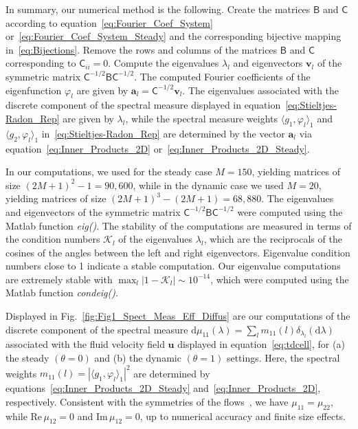 \documentclass[leqno,onefignum,onetabnum]{siamltex1213}
\newcommand{\figref}[1]{Fig.~\ref{#1}}
\renewcommand{\d}{\mathrm{d}}
\newcommand\Real{\mbox{Re}\,} %
\newcommand\Imag{\mbox{Im}\,} %
\newcommand{\Bm}{\mathsf{B}}
\newcommand{\Cm}{\mathsf{C}}
\newcommand{\vecv}{\boldsymbol{v}}
\newcommand{\veca}{\boldsymbol{a}}
\newcommand{\vecu}{\boldsymbol{u}}
\begin{document}
In summary, our numerical method is the following. Create the matrices
$\Bm$ and $\Cm$ according to equation~\eqref{eq:Fourier_Coef_System}
or~\eqref{eq:Fourier_Coef_System_Steady} and the corresponding
bijective mapping in~\eqref{eq:Bijections}. Remove the rows
and columns of the matrices $\Bm$ and $\Cm$ corresponding to
$\Cm_{ii}=0$. Compute the eigenvalues $\lambda_l$ and eigenvectors $\vecv_l$ of
the symmetric matrix $\Cm^{-1/2}\Bm\Cm^{-1/2}$. The computed Fourier
coefficients of the eigenfunction $\varphi_l$ are given by
$\veca_l=\Cm^{-1/2}\vecv_l$. The eigenvalues associated with the
discrete component of the spectral measure displayed in
equation~\eqref{eq:Stieltjes-Radon_Rep} are given by $\lambda_l$, while the
spectral measure weights $\langle g_1,\varphi_l\rangle_1$ and $\langle g_2,\varphi_l\rangle_1$
in~\eqref{eq:Stieltjes-Radon_Rep} are determined by the vector
$\veca_l$ via equation~\eqref{eq:Inner_Products_2D}
or~\eqref{eq:Inner_Products_2D_Steady}.     



In our computations, we used for the steady case $M=150$, yielding
matrices of size $(2M+1)^2-1=90,600$, while in the dynamic case we used
$M=20$, yielding matrices of size $(2M+1)^3-(2M+1)=68,880$. The
eigenvalues and eigenvectors of the symmetric matrix
$\Cm^{-1/2}\Bm\Cm^{-1/2}$ were computed using the Matlab function
\emph{eig()}. The stability of the computations are measured in terms
of the condition numbers $\mathcal{K}_l$ of the eigenvalues $\lambda_l$,
which are the reciprocals of the cosines of the angles between the
left and right eigenvectors. Eigenvalue condition numbers close to 1
indicate a stable computation. Our eigenvalue computations are
extremely stable with $\max_l|1-\mathcal{K}_l|\sim10^{-14}$, which were
computed using the Matlab function \emph{condeig()}.



Displayed in \figref{fig:Fig1_Spect_Meas_Eff_Diffus} are our
computations of the discrete component of the spectral measure
$\d\mu_{11}(\lambda)=\sum_lm_{11}(l)\delta_{\lambda_l}(\d\lambda)$ associated with the fluid
velocity field $\vecu$ displayed in equation~\eqref{eq:tdcell}, for (a)
the steady $(\theta=0)$ and (b) the dynamic $(\theta=1)$ settings. Here, the
spectral weights $m_{11}(l)=|\langle g_1,\varphi_l\rangle_1|^2$ are determined by
equations~\eqref{eq:Inner_Products_2D_Steady}
and~\eqref{eq:Inner_Products_2D}, respectively.  Consistent with the
symmetries of the flows~\cite{Biferale:PF:2725}, we have
$\mu_{11}=\mu_{22}$, while $\Real\mu_{12}=0$ and $\Imag\mu_{12}=0$, up to
numerical accuracy and finite size effects.
\end{document}
